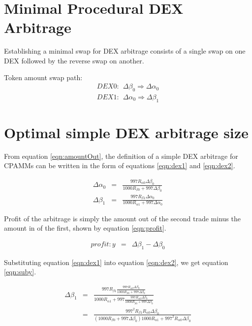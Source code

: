 \documentclass[runningheads]{llncs}
\begin{document}
	\section{Minimal Procedural DEX Arbitrage}
	Establishing a minimal swap for DEX arbitrage consists of a single swap on one DEX followed by the reverse swap on another.
	
	Token amount swap path:
	\begin{eqnarray}
		DEX0: \: \: \Delta\beta_{0} \Rightarrow \Delta\alpha_{0}\\
		DEX1: \: \: \Delta\alpha_{0} \Rightarrow \Delta\beta_{1}
	\end{eqnarray}
	
	\section{Optimal simple DEX arbitrage size}
	From equation \ref{eqn:amountOut}, the definition of a simple DEX arbitrage for CPAMMs can be written in the form of equations \ref{eqn:dex1} and \ref{eqn:dex2}.
	
	\begin{eqnarray}
		 \Delta\alpha_{0}  &=& \frac{997 R_{\alpha 0} \Delta\beta_{0} }{1000 R_{\beta 0} + 997 \Delta\beta_{0}} \label{eqn:dex1}\\
		 \Delta\beta_{1}  &=& \frac{997 R_{\beta 1} \Delta\alpha_{0} }{1000 R_{\alpha 1} + 997 \Delta\alpha_{0}} \label{eqn:dex2}
	\end{eqnarray}
	
	Profit of the arbitrage is simply the amount out of the second trade minus the amount in of the first, shown by equation \ref{eqn:profit}.
	
	\begin{eqnarray}
		profit: y  &=& \Delta\beta_{1} - \Delta\beta_{0} \label{eqn:profit}
	\end{eqnarray}
	
	
	Substituting equation \ref{eqn:dex1} into equation \ref{eqn:dex2}, we get equation \ref{eqn:suby}.
	
	\begin{eqnarray}
		\Delta\beta_{1}  &=& \frac{997 R_{\beta 1} \frac{997 R_{\alpha 0} \Delta\beta_{0} }{1000 R_{\beta 0} + 997 \Delta\beta_{0}} }{1000 R_{\alpha 1} + 997 \frac{997 R_{\alpha 0} \Delta\beta_{0} }{1000 R_{\beta 0} + 997 \Delta\beta_{0}}} \label{eqn:suby}\\
		&=& \frac{997^2 R_{\beta 1}  R_{\alpha 0} \Delta\beta_{0} }{(1000 R_{\beta 0} + 997 \Delta\beta_{0}) 1000 R_{\alpha 1} + 997^2 R_{\alpha 0} \Delta\beta_{0} } \label{eqn:subyMore}
	\end{eqnarray}
	
\end{document}
